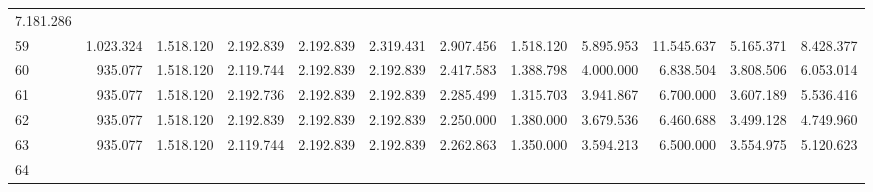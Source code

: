 \begin{tabular}{llllllllllll}
  \multicolumn{1}{r}{7.181.286} \\
\multicolumn{1}{l}{\hspace{1em}59} &
  \multicolumn{1}{|r}{1.023.324} &
  \multicolumn{1}{r}{1.518.120} &
  \multicolumn{1}{r}{2.192.839} &
  \multicolumn{1}{r}{2.192.839} &
  \multicolumn{1}{r}{2.319.431} &
  \multicolumn{1}{r}{2.907.456} &
  \multicolumn{1}{r}{1.518.120} &
  \multicolumn{1}{r}{5.895.953} &
  \multicolumn{1}{r}{11.545.637} &
  \multicolumn{1}{r}{5.165.371} &
  \multicolumn{1}{r}{8.428.377} \\
\multicolumn{1}{l}{\hspace{1em}60} &
  \multicolumn{1}{|r}{935.077} &
  \multicolumn{1}{r}{1.518.120} &
  \multicolumn{1}{r}{2.119.744} &
  \multicolumn{1}{r}{2.192.839} &
  \multicolumn{1}{r}{2.192.839} &
  \multicolumn{1}{r}{2.417.583} &
  \multicolumn{1}{r}{1.388.798} &
  \multicolumn{1}{r}{4.000.000} &
  \multicolumn{1}{r}{6.838.504} &
  \multicolumn{1}{r}{3.808.506} &
  \multicolumn{1}{r}{6.053.014} \\
\multicolumn{1}{l}{\hspace{1em}61} &
  \multicolumn{1}{|r}{935.077} &
  \multicolumn{1}{r}{1.518.120} &
  \multicolumn{1}{r}{2.192.736} &
  \multicolumn{1}{r}{2.192.839} &
  \multicolumn{1}{r}{2.192.839} &
  \multicolumn{1}{r}{2.285.499} &
  \multicolumn{1}{r}{1.315.703} &
  \multicolumn{1}{r}{3.941.867} &
  \multicolumn{1}{r}{6.700.000} &
  \multicolumn{1}{r}{3.607.189} &
  \multicolumn{1}{r}{5.536.416} \\
\multicolumn{1}{l}{\hspace{1em}62} &
  \multicolumn{1}{|r}{935.077} &
  \multicolumn{1}{r}{1.518.120} &
  \multicolumn{1}{r}{2.192.839} &
  \multicolumn{1}{r}{2.192.839} &
  \multicolumn{1}{r}{2.192.839} &
  \multicolumn{1}{r}{2.250.000} &
  \multicolumn{1}{r}{1.380.000} &
  \multicolumn{1}{r}{3.679.536} &
  \multicolumn{1}{r}{6.460.688} &
  \multicolumn{1}{r}{3.499.128} &
  \multicolumn{1}{r}{4.749.960} \\
\multicolumn{1}{l}{\hspace{1em}63} &
  \multicolumn{1}{|r}{935.077} &
  \multicolumn{1}{r}{1.518.120} &
  \multicolumn{1}{r}{2.119.744} &
  \multicolumn{1}{r}{2.192.839} &
  \multicolumn{1}{r}{2.192.839} &
  \multicolumn{1}{r}{2.262.863} &
  \multicolumn{1}{r}{1.350.000} &
  \multicolumn{1}{r}{3.594.213} &
  \multicolumn{1}{r}{6.500.000} &
  \multicolumn{1}{r}{3.554.975} &
  \multicolumn{1}{r}{5.120.623} \\
\multicolumn{1}{l}{\hspace{1em}64} &

\end{tabular}
